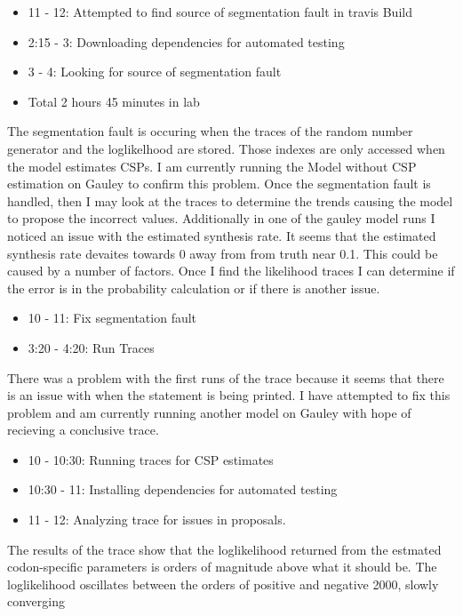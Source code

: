 \documentclass[12pt,hyperref]{labbook}
\begin{document}
\begin{itemize}
    \item 11 - 12: Attempted to find source of segmentation fault in travis Build
    \item 2:15 - 3: Downloading dependencies for automated testing
    \item 3 - 4: Looking for source of segmentation fault
    \item Total 2 hours 45 minutes in lab
\end{itemize}
The segmentation fault is occuring when the traces of the random number generator and the loglikelhood are stored.
Those indexes are only accessed when the model estimates CSPs. I am currently running the Model without CSP estimation on
Gauley to confirm this problem. Once the segmentation fault is handled, then I may look at the traces to determine the trends
causing the model to propose the incorrect values. Additionally in one of the gauley model runs I noticed an issue with the
estimated synthesis rate. It seems that the estimated synthesis rate devaites towards 0 away from from truth near 0.1. This could
be caused by a number of factors. Once I find the likelihood traces I can determine if the error is in the probability calculation
or if there is another issue.
\begin{itemize}
    \item 10 - 11: Fix segmentation fault
    \item 3:20 - 4:20: Run Traces
\end{itemize}
There was a problem with the first runs of the trace because it seems that there is an issue with when the statement is being
printed. I have attempted to fix this problem and am currently running another model on Gauley with hope of recieving a conclusive trace.
\begin{itemize}
    \item 10 - 10:30: Running traces for CSP estimates
    \item 10:30 - 11: Installing dependencies for automated testing
    \item 11 - 12: Analyzing trace for issues in proposals.
\end{itemize}
The results of the trace show that the loglikelihood returned from the estmated codon-specific parameters is orders of
magnitude above what it should be. The loglikelihood oscillates between the orders of positive and negative 2000, slowly converging
\end{document}
